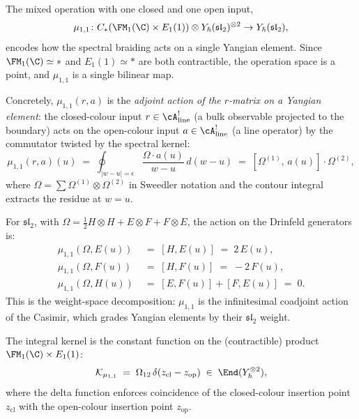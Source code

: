\begin{computation}
\label{comp:mu11-mixed}
The mixed operation with one closed and one open input,
\[
\mu_{1,1} \colon C_*(\FM_1(\C) \times E_1(1)) \otimes
Y_\hbar(\mathfrak{sl}_2)^{\otimes 2} \to
Y_\hbar(\mathfrak{sl}_2),
\]
encodes how the spectral braiding acts on a single Yangian
element. Since $\FM_1(\C) \simeq *$ and $E_1(1) \simeq *$
are both contractible, the operation space is a point, and
$\mu_{1,1}$ is a single bilinear map.

Concretely, $\mu_{1,1}(r, a)$ is the \emph{adjoint action of
the $r$-matrix on a Yangian element}: the closed-colour input
$r \in \cA^!_{\mathrm{line}}$ (a bulk observable projected to
the boundary) acts on the open-colour input
$a \in \cA^!_{\mathrm{line}}$ (a line operator) by the
commutator twisted by the spectral kernel:
\begin{equation}\label{eq:mu11-explicit}
\mu_{1,1}(r, a)(u)
\;=\;
\oint_{|w - u| = \epsilon}
\frac{\Omega \cdot a(u)}{w - u}\,d(w - u)
\;=\;
[\Omega^{(1)},\, a(u)] \cdot \Omega^{(2)},
\end{equation}
where $\Omega = \sum \Omega^{(1)} \otimes \Omega^{(2)}$
in Sweedler notation and the contour integral extracts the
residue at $w = u$.

For $\mathfrak{sl}_2$, with
$\Omega = \tfrac{1}{2}H \otimes H + E \otimes F + F \otimes E$,
the action on the Drinfeld generators is:
\begin{align}
\mu_{1,1}(\Omega, E(u))
&\;=\;
[H, E(u)] \;=\; 2\,E(u),
\label{eq:mu11-E}
\\
\mu_{1,1}(\Omega, F(u))
&\;=\;
[H, F(u)] \;=\; -2\,F(u),
\label{eq:mu11-F}
\\
\mu_{1,1}(\Omega, H(u))
&\;=\;
[E, F(u)] + [F, E(u)] \;=\; 0.
\label{eq:mu11-H}
\end{align}
This is the weight-space decomposition: $\mu_{1,1}$ is the
infinitesimal coadjoint action of the Casimir, which grades
Yangian elements by their $\mathfrak{sl}_2$ weight.

The integral kernel is the constant function on the
(contractible) product $\FM_1(\C) \times E_1(1)$:
\begin{equation}\label{eq:mu11-kernel}
\mathcal{K}_{\mu_{1,1}}
\;=\;
\Omega_{12}\,\delta(z_{\mathrm{cl}} - z_{\mathrm{op}})
\;\in\;
\End(Y_\hbar^{\otimes 2}),
\end{equation}
where the delta function enforces coincidence of the closed-colour
insertion point $z_{\mathrm{cl}}$ with the open-colour
insertion point $z_{\mathrm{op}}$.
\end{computation}

